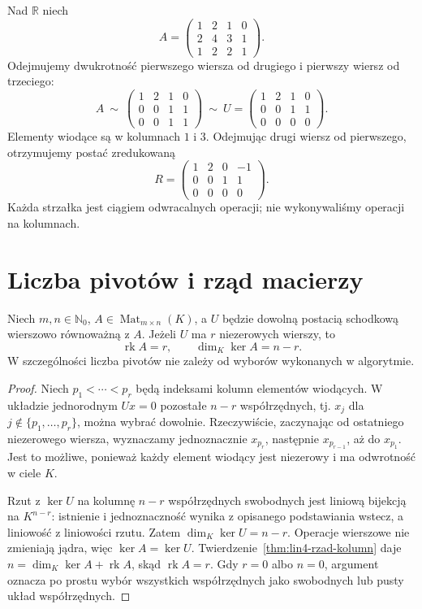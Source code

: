 \begin{przyklad}
\label{prz:lin5-pierwsza-eliminacja}
Nad \(\mathbb R\) niech
\[
 A=\begin{pmatrix}
 1&2&1&0\\
 2&4&3&1\\
 1&2&2&1
 \end{pmatrix}.
\]
Odejmujemy dwukrotność pierwszego wiersza
od drugiego i pierwszy wiersz od trzeciego:
\[
 A\ \sim\
 \begin{pmatrix}
 1&2&1&0\\
 0&0&1&1\\
 0&0&1&1
 \end{pmatrix}
 \ \sim\
 U=\begin{pmatrix}
 1&2&1&0\\
 0&0&1&1\\
 0&0&0&0
 \end{pmatrix}.
\]
Elementy wiodące są w kolumnach \(1\) i \(3\).
Odejmując drugi wiersz od pierwszego,
otrzymujemy postać zredukowaną
\[
 R=\begin{pmatrix}
 1&2&0&-1\\
 0&0&1&1\\
 0&0&0&0
 \end{pmatrix}.
\]
Każda strzałka jest ciągiem odwracalnych
operacji; nie wykonywaliśmy operacji
na kolumnach.
\end{przyklad}

\section{Liczba pivotów i rząd macierzy}
\label{sec:lin5-rzad}

\begin{twierdzenie}
\label{thm:lin5-rzad-pivoty}
Niech \(m,n\in\mathbb N_0\),
\(A\in\operatorname{Mat}_{m\times n}(K)\),
a \(U\) będzie dowolną postacią schodkową
wierszowo równoważną z \(A\).
Jeżeli \(U\) ma \(r\) niezerowych wierszy,
to
\[
 \operatorname{rk}A=r,\qquad
 \dim_K\ker A=n-r.
\]
W szczególności liczba pivotów nie zależy
od wyborów wykonanych w algorytmie.
\end{twierdzenie}
\begin{proof}
Niech \(p_1<\cdots<p_r\) będą indeksami
kolumn elementów wiodących.
W układzie jednorodnym \(Ux=0\)
pozostałe \(n-r\) współrzędnych, tj.
\(x_j\) dla \(j\notin\{p_1,\ldots,p_r\}\),
można wybrać dowolnie. Rzeczywiście,
zaczynając od ostatniego niezerowego wiersza,
wyznaczamy jednoznacznie \(x_{p_r}\),
następnie \(x_{p_{r-1}}\), aż do \(x_{p_1}\).
Jest to możliwe, ponieważ każdy
element wiodący jest niezerowy
i ma odwrotność w ciele \(K\).

Rzut z \(\ker U\) na kolumnę \(n-r\)
współrzędnych swobodnych jest liniową
bijekcją na \(K^{n-r}\):
istnienie i jednoznaczność wynika
z opisanego podstawiania wstecz,
a liniowość z liniowości rzutu.
Zatem \(\dim_K\ker U=n-r\).
Operacje wierszowe nie zmieniają jądra,
więc \(\ker A=\ker U\).
Twierdzenie~\ref{thm:lin4-rzad-kolumn}
daje
\(n=\dim_K\ker A+\operatorname{rk}A\),
skąd \(\operatorname{rk}A=r\).
Gdy \(r=0\) albo \(n=0\), argument
oznacza po prostu wybór wszystkich
współrzędnych jako swobodnych lub
pusty układ współrzędnych.
\end{proof}

